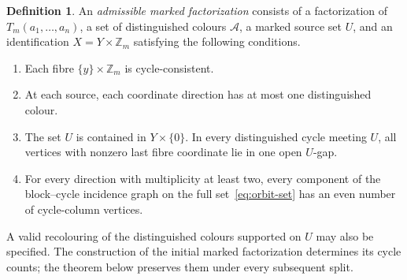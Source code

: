 \documentclass[11pt,reqno]{amsart}
\numberwithin{equation}{section}
\theoremstyle{definition}
\newtheorem{definition}[theorem]{Definition}
\theoremstyle{remark}
\newcommand{\Zm}{\mathbb Z_m}
\newcommand{\cA}{\mathcal A}
\begin{document}
\begin{definition}\label{def:collar}
An \emph{admissible marked factorization} consists of a factorization of
$T_m(a_1,\ldots,a_n)$, a set of distinguished colours $\cA$, a marked source set $U$, and an
identification $X=Y\times\Zm$ satisfying the following conditions.
\begin{enumerate}
\item Each fibre $\{y\}\times\Zm$ is cycle-consistent.
\item At each source, each coordinate direction has at most one distinguished colour.
\item The set $U$ is contained in $Y\times\{0\}$. In every distinguished cycle meeting
$U$, all vertices with nonzero last fibre coordinate lie in one open $U$-gap.
\item For every direction with multiplicity at least two, every component of the
block--cycle incidence graph on the full set~\eqref{eq:orbit-set} has an even
number of cycle-column vertices.
\end{enumerate}
A valid recolouring of the distinguished colours supported on $U$ may also be
specified. The construction of the initial marked factorization determines its
cycle counts; the theorem below preserves them under every subsequent split.
\end{definition}
\end{document}
